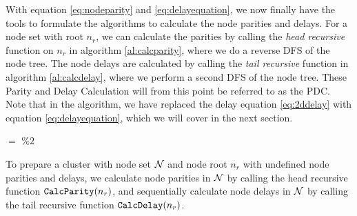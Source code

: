 With equation \eqref{eq:nodeparity} and \eqref{eq:delayequation}, we now finally have the tools to formulate the algorithms to calculate the node parities and delays. For a node set with root $n_r$, we can calculate the parities by calling the \emph{head recursive} function  on $n_r$ in algorithm \ref{al:calcparity}, where we do a reverse DFS of the node tree. The node delays are calculated by calling the \emph{tail recursive} function  in algorithm \ref{al:calcdelay}, where we perform a second DFS of the node tree. These Parity and Delay Calculation will from this point be referred to as the PDC. Note that in the  algorithm, we have replaced the delay equation \eqref{eq:2ddelay} with equation \eqref{eq:delayequation}, which we will cover in the next section.

\begin{algo}[algotitle=CalcParity, label=al:calcparity]
\begin{algorithm}[H]

\KwData{\node}

\BlankLine

\parity $=$  $\%2$\;
\end{algorithm}
\end{algo}

\begin{algo}[algotitle=CalcDelay, label=al:calcdelay]
\begin{algorithm}[H]

\KwData{\node, \cluster}

\BlankLine

\end{algorithm}
\end{algo}
\begin{theorem}
  To prepare a cluster with node set $\mathcal{N}$ and node root $n_r$ with undefined node parities and delays, we calculate node parities in $\mathcal{N}$ by calling the head recursive function $\texttt{CalcParity}(n_r)$, and sequentially calculate node delays in $\mathcal{N}$ by calling the tail recursive function $\texttt{CalcDelay}(n_r)$.
\end{theorem}

